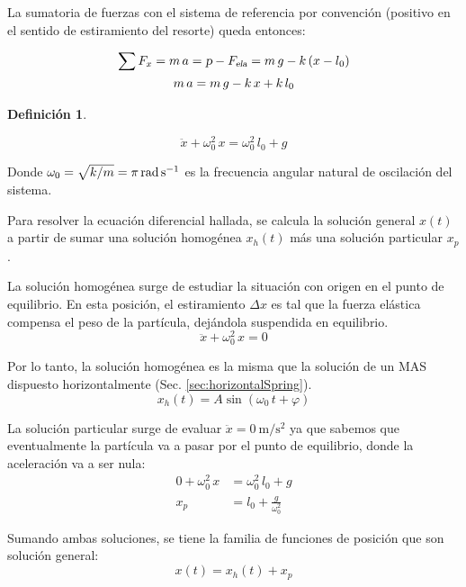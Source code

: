 \documentclass[a5paper,12pt,twoside]{book}
\newtheorem{defn}{{Definición}}[chapter]
\begin{document}
La sumatoria de fuerzas con el sistema de referencia por convención (positivo en el sentido de estiramiento del resorte) queda entonces:

\begin{gather*}
    \sum F_x = m \, a = \textsl{p} - {{F}_\textsl{{ela}}}  = m \, g - k \left(x-l_0\right)
    \\
    m \, a = m \, g - k \, x + k \, l_0
\end{gather*}

\begin{mdframed}[style=MyFrame1]
    \begin{defn}
        \label{defn:}
    \end{defn}
    \begin{equation*}
        \ddot{x} + \omega_0^2 \, x = \omega_0^2 \, l_0 + g
    \end{equation*}
\end{mdframed}

Donde $\omega_0 = \sqrt{k/m}=\pi\,\si{\radian\per\second}$ es la frecuencia angular natural de oscilación del sistema.

Para resolver la ecuación diferencial hallada, se calcula la solución general $x(t)$ a partir de sumar una solución homogénea $x_h(t)$ más una solución particular $x_p$.

La solución homogénea surge de estudiar la situación con origen en el punto de equilibrio. En esta posición, el estiramiento $\Delta x$ es tal que la fuerza elástica compensa el peso de la partícula, dejándola suspendida en equilibrio.
\[ \ddot{x} + \omega_0^2 \, x = 0 \]

Por lo tanto, la solución homogénea es la misma que la solución de un MAS dispuesto horizontalmente (Sec. \ref{sec:horizontalSpring}).
\[ x_h(t) = A \sin{(\omega_0 \, t + \varphi)} \]

La solución particular surge de evaluar $\ddot{x} = \SI{0}{\metre \per \second^2}$ ya que sabemos que eventualmente la partícula va a pasar por el punto de equilibrio, donde la aceleración va a ser nula:
\begin{align*}
    0 + \omega_0^2 \, x &= \omega_0^2 \, l_0 + g
    \\
    x_p &= l_0 + \frac{g}{\omega_0^2}
\end{align*}

Sumando ambas soluciones, se tiene la familia de funciones de posición que son solución general:
\begin{equation*}
    x(t) = x_h(t) + x_p
\end{equation*}
\end{document}
